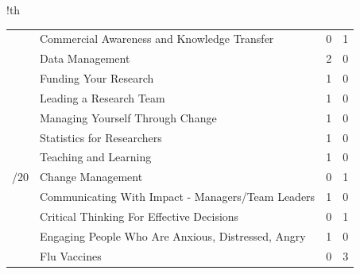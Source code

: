 \begin{tabbox}{!th}
\begin{tabular}{p{1.5cm}
                p{9.5cm}
                R{1cm}
                R{1cm}}
    & Commercial Awareness and Knowledge Transfer & 0 & 1 \\
    & Data Management & 2 & 0 \\
    & Funding Your Research & 1 & 0 \\
    & Leading a Research Team & 1 & 0 \\
    & Managing Yourself Through Change & 1 & 0 \\
    & Statistics for Researchers & 1 & 0 \\
    & Teaching and Learning & 1 & 0 \\
    /20 & Change Management & 0 & 1 \\
    & Communicating With Impact - Managers/Team Leaders & 1 & 0\\
    & Critical Thinking For Effective Decisions & 0 & 1 \\
    & Engaging People Who Are Anxious, Distressed, Angry & 1 & 0 \\
    & Flu Vaccines & 0 & 3 \\
\bottomrule      
\end{tabular}
    
\end{tabbox}


